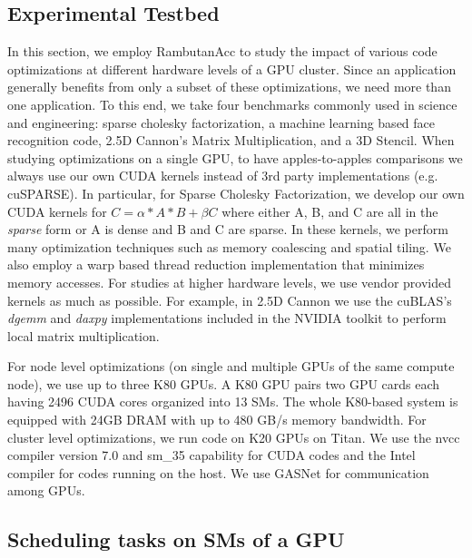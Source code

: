 \subsection{Experimental Testbed}
In this section, we employ RambutanAcc to study the impact of various code optimizations at different hardware levels of a GPU cluster.
Since an application generally benefits from only a subset of these optimizations, we need more than one application.
To this end, we take four benchmarks commonly used in science and engineering: sparse cholesky factorization, a machine learning based face recognition code, 2.5D Cannon's Matrix Multiplication, and a 3D Stencil.
When studying optimizations on a single GPU, to have apples-to-apples comparisons we always use our own CUDA kernels instead of 3rd party implementations (e.g. cuSPARSE). 
In particular, for Sparse Cholesky Factorization, we develop our own CUDA kernels for $C = \alpha* A * B + \beta C$ where either A, B, and C are all in the {\em sparse} form or A is dense and B and C are sparse.
In these kernels, we perform many optimization techniques such as memory coalescing and spatial tiling.
We also employ a warp based thread reduction implementation that minimizes memory accesses. 
For studies at higher hardware levels, we use vendor provided kernels as much as possible.
For example, in  2.5D Cannon we use the cuBLAS's {\em dgemm} and {\em daxpy} implementations included in the NVIDIA toolkit to perform local matrix multiplication.

For node level optimizations (on single and multiple GPUs of the same compute node), we use up to three K80 GPUs.
A K80 GPU pairs two GPU cards each having 2496 CUDA cores organized into 13 SMs.
The whole K80-based system is equipped with 24GB DRAM with up to 480 GB/s memory bandwidth.
For cluster level optimizations, we run code on K20 GPUs on Titan.
We use the nvcc compiler version 7.0 and sm\_35 capability for CUDA codes and the Intel compiler for codes running on the host.
We use GASNet for communication among GPUs. 


\subsection{Scheduling tasks on SMs of a GPU}

